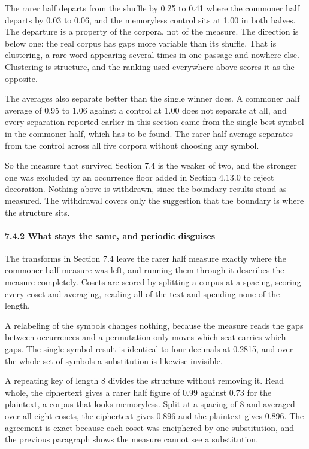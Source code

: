 The rarer half departs from the shuffle by 0.25 to 0.41 where the commoner half departs by 0.03 to 0.06, and the memoryless control sits at 1.00 in both halves. The departure is a property of the corpora, not of the measure. The direction is below one: the real corpus has gaps more variable than its shuffle. That is clustering, a rare word appearing several times in one passage and nowhere else. Clustering is structure, and the ranking used everywhere above scores it as the opposite.

The averages also separate better than the single winner does. A commoner half average of 0.95 to 1.06 against a control at 1.00 does not separate at all, and every separation reported earlier in this section came from the single best symbol in the commoner half, which has to be found. The rarer half average separates from the control across all five corpora without choosing any symbol.

So the measure that survived Section 7.4 is the weaker of two, and the stronger one was excluded by an occurrence floor added in Section 4.13.0 to reject decoration. Nothing above is withdrawn, since the boundary results stand as measured. The withdrawal covers only the suggestion that the boundary is where the structure sits.

\paragraph{7.4.2 What stays the same, and periodic disguises}

The transforms in Section 7.4 leave the rarer half measure exactly where the commoner half measure was left, and running them through it describes the measure completely. Cosets are scored by splitting a corpus at a spacing, scoring every coset and averaging, reading all of the text and spending none of the length.

A relabeling of the symbols changes nothing, because the measure reads the gaps between occurrences and a permutation only moves which seat carries which gaps. The single symbol result is identical to four decimals at 0.2815, and over the whole set of symbols a substitution is likewise invisible.

A repeating key of length 8 divides the structure without removing it. Read whole, the ciphertext gives a rarer half figure of 0.99 against 0.73 for the plaintext, a corpus that looks memoryless. Split at a spacing of 8 and averaged over all eight cosets, the ciphertext gives 0.896 and the plaintext gives 0.896. The agreement is exact because each coset was enciphered by one substitution, and the previous paragraph shows the measure cannot see a substitution.


